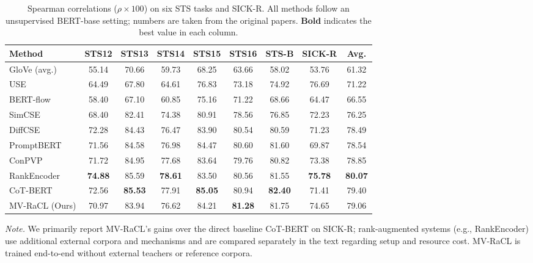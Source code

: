 \documentclass[a4paper,fleqn]{cas-dc}
\begin{document}
\begin{table}[t]
\centering
\caption{Spearman correlations ($\rho \times 100$) on six STS tasks and SICK-R. All methods follow an unsupervised BERT-base setting; numbers are taken from the original papers. \textbf{Bold} indicates the best value in each column.}
\label{tab:main}
\small
\setlength{\tabcolsep}{4pt}
\begin{tabular*}{\tblwidth}{@{\extracolsep{\fill}}lcccccccc@{}}
\toprule
Method & STS12 & STS13 & STS14 & STS15 & STS16 & STS-B & SICK-R & Avg. \\
\midrule
GloVe (avg.)         & 55.14          & 70.66          & 59.73          & 68.25          & 63.66          & 58.02          & 53.76          & 61.32          \\
USE                  & 64.49          & 67.80          & 64.61          & 76.83          & 73.18          & 74.92          & 76.69          & 71.22          \\
BERT-flow            & 58.40          & 67.10          & 60.85          & 75.16          & 71.22          & 68.66          & 64.47          & 66.55          \\
SimCSE~\cite{simcse}              & 68.40          & 82.41          & 74.38          & 80.91          & 78.56          & 76.85          & 72.23          & 76.25          \\
DiffCSE~\cite{diffcse}             & 72.28          & 84.43          & 76.47          & 83.90          & 80.54          & 80.59          & 71.23          & 78.49          \\
PromptBERT~\cite{promptbert}          & 71.56          & 84.58          & 76.98          & 84.47          & 80.60          & 81.60          & 69.87          & 78.54          \\
ConPVP~\cite{conpvp}              & 71.72          & 84.95          & 77.68          & 83.64          & 79.76          & 80.82          & 73.38          & 78.85          \\
RankEncoder~\cite{rankencoder}         & \textbf{74.88} & 85.59          & \textbf{78.61} & 83.50          & 80.56          & 81.55          & \textbf{75.78} & \textbf{80.07} \\
CoT-BERT~\cite{cotbert}            & 72.56          & \textbf{85.53} & 77.91          & \textbf{85.05} & 80.94          & \textbf{82.40} & 71.41          & 79.40          \\
MV-RaCL (Ours) & 70.97       & 83.94          & 76.62          & 84.21          & \textbf{81.28} & 81.75          & 74.65          & 79.06          \\
\bottomrule
\end{tabular*}

\vspace{4pt}
{\footnotesize\raggedright
\noindent\textit{Note.} We primarily report MV-RaCL's gains over the direct baseline CoT-BERT on SICK-R\@; rank-augmented systems (e.g., RankEncoder) use additional external corpora and mechanisms and are compared separately in the text regarding setup and resource cost. MV-RaCL is trained end-to-end without external teachers or reference corpora.\par
}
\end{table}
\end{document}

